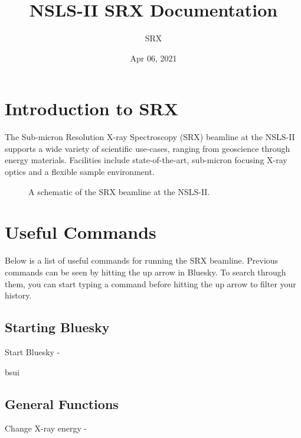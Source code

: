 \documentclass[letterpaper,10pt,english]{sphinxmanual}
\title{NSLS-II SRX Documentation}
\date{Apr 06, 2021}
\author{SRX}
\begin{document}
\pagestyle{empty}
\sphinxmaketitle
\pagestyle{plain}
\sphinxtableofcontents
\pagestyle{normal}
\label{\detokenize{index::doc}}



\chapter{Introduction to SRX}
\label{\detokenize{intro:introduction-to-srx}}\label{\detokenize{intro::doc}}
The Sub-micron Resolution X-ray Spectroscopy (SRX) beamline at the NSLS-II supports a wide variety of scientific use-cases, ranging from geoscience through energy materials. Facilities include state-of-the-art, sub-micron focusing X-ray optics and a flexible sample environment.

\begin{figure}[htbp]
\centering
\capstart

\caption{A schematic of the SRX beamline at the NSLS-II.}\label{\detokenize{intro:id1}}\label{\detokenize{intro:fig-prompt}}\end{figure}


\chapter{Useful Commands}
\label{\detokenize{useful:useful-commands}}\label{\detokenize{useful::doc}}
Below is a list of useful commands for running the SRX beamline. Previous commands can be seen by hitting the up arrow in Bluesky. To search through them, you can start typing a command before hitting the up arrow to filter your history.


\section{Starting Bluesky}
\label{\detokenize{useful:starting-bluesky}}
Start Bluesky - 

\begin{sphinxVerbatim}[commandchars=\\\{\}]
\PYGZdl{} bsui
\end{sphinxVerbatim}


\section{General Functions}
\label{\detokenize{useful:general-functions}}
Change X-ray energy - 
\end{document}
